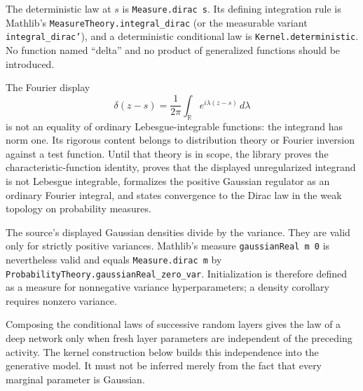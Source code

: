 \begin{remark}
The deterministic law at $s$ is \texttt{Measure.dirac s}.  Its defining integration rule is
Mathlib's \texttt{MeasureTheory.integral\_dirac} (or the measurable variant
\texttt{integral\_dirac'}), and a deterministic conditional law is
\texttt{Kernel.deterministic}.  No function named ``delta'' and no product of generalized
functions should be introduced.

The Fourier display
\[
  \delta(z-s)=\frac1{2\pi}\int_{\mathbb R}e^{i\lambda(z-s)}\,d\lambda
\]
is not an equality of ordinary Lebesgue-integrable functions: the integrand has norm one.  Its
rigorous content belongs to distribution theory or Fourier inversion against a test function.
Until that theory is in scope, the library proves the characteristic-function identity, proves
that the displayed unregularized integrand is not Lebesgue integrable, formalizes the positive
Gaussian regulator as an ordinary Fourier integral, and states convergence to the Dirac law in
the weak topology on probability measures.
\end{remark}

\begin{remark}
The source's displayed Gaussian densities divide by the variance.  They are valid only for
strictly positive variances.  Mathlib's measure \texttt{gaussianReal m 0} is nevertheless valid and
equals \texttt{Measure.dirac m} by \texttt{ProbabilityTheory.gaussianReal\_zero\_var}.  Initialization
is therefore defined as a measure for nonnegative variance hyperparameters; a density corollary
requires nonzero variance.
\end{remark}

\begin{remark}
Composing the conditional laws of successive random layers gives the law of a deep network only
when fresh layer parameters are independent of the preceding activity.  The kernel construction
below builds this independence into the generative model.  It must not be inferred merely from
the fact that every marginal parameter is Gaussian.
\end{remark}

